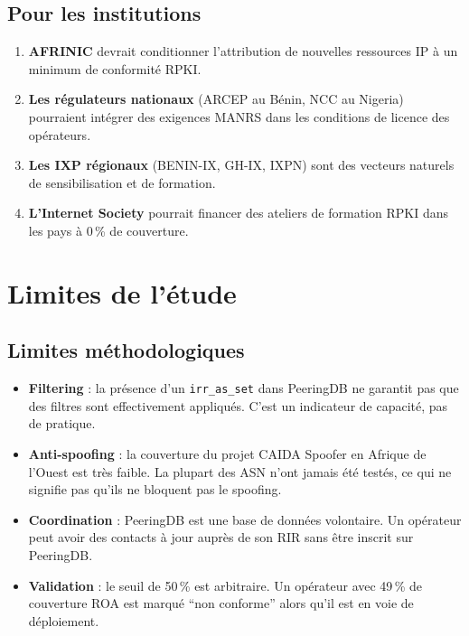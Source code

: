 \documentclass{eneam}
\begin{document}
\subsection{Pour les institutions}

\begin{enumerate}
    \item \textbf{AFRINIC} devrait conditionner l'attribution de nouvelles ressources IP à un minimum de conformité RPKI.
    \item \textbf{Les régulateurs nationaux} (ARCEP au Bénin, NCC au Nigeria) pourraient intégrer des exigences MANRS dans les conditions de licence des opérateurs.
    \item \textbf{Les IXP régionaux} (BENIN-IX, GH-IX, IXPN) sont des vecteurs naturels de sensibilisation et de formation.
    \item \textbf{L'Internet Society} pourrait financer des ateliers de formation RPKI dans les pays à 0\,\% de couverture.
\end{enumerate}

\section{Limites de l'étude}

\subsection{Limites méthodologiques}

\begin{itemize}
    \item \textbf{Filtering} : la présence d'un \texttt{irr\_as\_set} dans PeeringDB ne garantit pas que des filtres sont effectivement appliqués. C'est un indicateur de capacité, pas de pratique.
    \item \textbf{Anti-spoofing} : la couverture du projet CAIDA Spoofer en Afrique de l'Ouest est très faible. La plupart des ASN n'ont jamais été testés, ce qui ne signifie pas qu'ils ne bloquent pas le spoofing.
    \item \textbf{Coordination} : PeeringDB est une base de données volontaire. Un opérateur peut avoir des contacts à jour auprès de son RIR sans être inscrit sur PeeringDB.
    \item \textbf{Validation} : le seuil de 50\,\% est arbitraire. Un opérateur avec 49\,\% de couverture ROA est marqué ``non conforme'' alors qu'il est en voie de déploiement.
\end{itemize}
\end{document}
